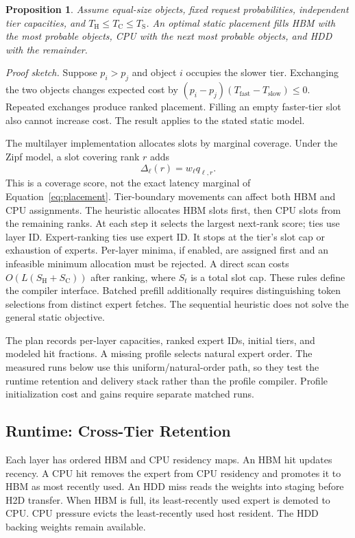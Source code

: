 \documentclass[conference,9pt,letterpaper]{IEEEtran}
\newtheorem{proposition}{Proposition}
\begin{document}
\begin{proposition}
Assume equal-size objects, fixed request probabilities, independent tier capacities, and $T_{\mathrm H}\le T_{\mathrm C}\le T_{\mathrm S}$. An optimal static placement fills HBM with the most probable objects, CPU with the next most probable objects, and HDD with the remainder.
\end{proposition}
\noindent\emph{Proof sketch.} Suppose $p_i>p_j$ and object $i$ occupies the slower tier. Exchanging the two objects changes expected cost by $(p_i-p_j)(T_{\mathrm{fast}}-T_{\mathrm{slow}})\le0$. Repeated exchanges produce ranked placement. Filling an empty faster-tier slot also cannot increase cost. The result applies to the stated static model.

The multilayer implementation allocates slots by marginal coverage. Under the Zipf model, a slot covering rank $r$ adds
\begin{equation}
 \Delta_{\ell}(r)=w_\ell q_{\ell,r}.
\end{equation}
This is a coverage score, not the exact latency marginal of Equation~\ref{eq:placement}. Tier-boundary movements can affect both HBM and CPU assignments. The heuristic allocates HBM slots first, then CPU slots from the remaining ranks. At each step it selects the largest next-rank score; ties use layer ID. Expert-ranking ties use expert ID. It stops at the tier's slot cap or exhaustion of experts. Per-layer minima, if enabled, are assigned first and an infeasible minimum allocation must be rejected. A direct scan costs $O(L(S_{\mathrm H}+S_{\mathrm C}))$ after ranking, where $S_t$ is a total slot cap. These rules define the compiler interface. Batched prefill additionally requires distinguishing token selections from distinct expert fetches. The sequential heuristic does not solve the general static objective.

The plan records per-layer capacities, ranked expert IDs, initial tiers, and modeled hit fractions. A missing profile selects natural expert order. The measured runs below use this uniform/natural-order path, so they test the runtime retention and delivery stack rather than the profile compiler. Profile initialization cost and gains require separate matched runs.

\subsection{Runtime: Cross-Tier Retention}
Each layer has ordered HBM and CPU residency maps. An HBM hit updates recency. A CPU hit removes the expert from CPU residency and promotes it to HBM as most recently used. An HDD miss reads the weights into staging before H2D transfer. When HBM is full, its least-recently used expert is demoted to CPU. CPU pressure evicts the least-recently used host resident. The HDD backing weights remain available.
\end{document}
